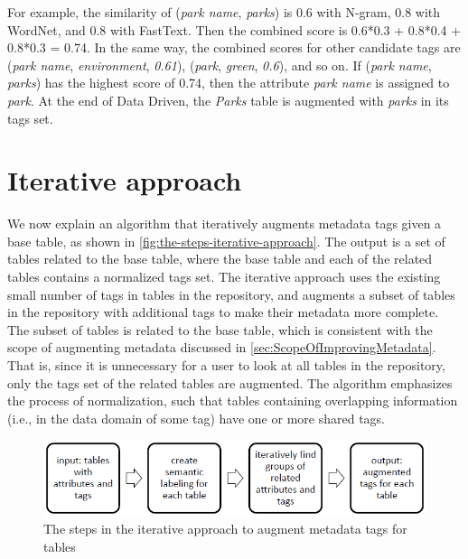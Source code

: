 For example, the similarity of (\textit{park name}, \textit{parks}) is 0.6 with N-gram, 0.8 with WordNet, and 0.8 with FastText. Then the combined score is 0.6*0.3 + 0.8*0.4 + 0.8*0.3 = 0.74. In the same way, the combined scores for other candidate tags are (\textit{park name}, \textit{environment}, \textit{0.61}), (\textit{park}, \textit{green}, \textit{0.6}), and so on. If (\textit{park name}, \textit{parks}) has the highest score of 0.74, then the attribute \textit{park name} is assigned to \textit{park}. At the end of Data Driven, the \textit{Parks} table is augmented with \textit{parks} in its tags set.

\section{Iterative approach}
\label{sec:IterativeApproach}

We now explain an algorithm that iteratively augments metadata tags given a base table, as shown in \autoref{fig:the-steps-iterative-approach}. The output is a set of tables related to the base table, where the base table and each of the related tables contains a normalized tags set. The iterative approach uses the existing small number of tags in tables in the repository, and augments a subset of tables in the repository with additional tags to make their metadata more complete. The subset of tables is related to the base table, which is consistent with the scope of augmenting metadata discussed in \autoref{sec:ScopeOfImprovingMetadata}. That is, since it is unnecessary for a user to look at all tables in the repository, only the tags set of the related tables are augmented. The algorithm emphasizes the process of normalization, such that tables containing overlapping information (i.e., in the data domain of some tag) have one or more shared tags.

\begin{figure}
    \centering
    \includegraphics[width=5in]{figures/the-steps-iterative-approach.png}
    \caption{The steps in the iterative approach to augment metadata tags for tables}
    \label{fig:the-steps-iterative-approach}
\end{figure}


